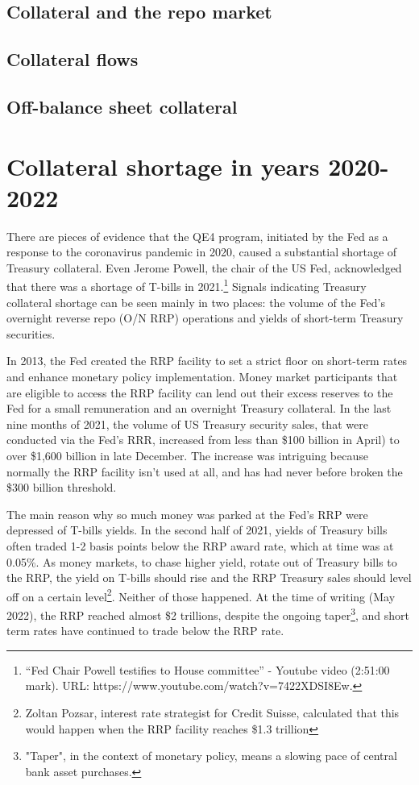 \documentclass[11pt,a4paper,english,oneside]{article}
\begin{document}
\subsection{Collateral and the repo market} %

\subsection{Collateral flows} %

\subsection{Off-balance sheet collateral} %

\newpage

\section{Collateral shortage in years 2020-2022} \label{sec:shortage}%

There are pieces of evidence that the QE4 program, initiated by the Fed as a response to the coronavirus pandemic in 2020, caused a substantial shortage of Treasury collateral. Even Jerome Powell, the chair of the US Fed, acknowledged that there was a shortage of T-bills in 2021.\footnote{“Fed Chair Powell testifies to House committee” - Youtube video (2:51:00 mark). URL: https://www.youtube.com/watch?v=7422XDSI8Ew.} Signals indicating Treasury collateral shortage can be seen mainly in two places: the volume of the Fed's overnight reverse repo (O/N RRP) operations and yields of short-term Treasury securities.

In 2013, the Fed created the RRP facility to set a strict floor on short-term rates and enhance monetary policy implementation. Money market participants that are eligible to access the RRP facility can lend out their excess reserves to the Fed for a small remuneration and an overnight Treasury collateral. In the last nine months of 2021, the volume of US Treasury security sales, that were conducted via the Fed's RRR, increased from less than \$100 billion in April) to over \$1,600 billion in late December. The increase was intriguing because normally the RRP facility isn't used at all, and has had never before broken the \$300 billion threshold.

The main reason why so much money was parked at the Fed's RRP were depressed of T-bills yields. In the second half of 2021, yields of Treasury bills often traded 1-2 basis points below the RRP award rate, which at time was at 0.05\%. As money markets, to chase higher yield, rotate out of Treasury bills to the RRP, the yield on T-bills should rise and the RRP Treasury sales should level off on a certain level\footnote{Zoltan Pozsar, interest rate strategist for Credit Suisse, calculated that this would happen when the RRP facility reaches \$1.3 trillion}. Neither of those happened. At the time of writing (May 2022), the RRP reached almost \$2 trillions, despite the ongoing taper\footnote{"Taper", in the context of monetary policy, means a slowing pace of central bank asset purchases.}, and short term rates have continued to trade below the RRP rate.
\end{document}
